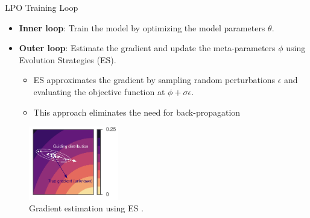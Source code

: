 \documentclass[9pt]{beamer}
\begin{document}
\begin{frame}{LPO Training Loop}

  \begin{itemize}
    \item \textbf{Inner loop}:
      Train the model by optimizing the model parameters \( \theta \).

    \vspace{1em}  %
    \item \textbf{Outer loop}:
      Estimate the gradient and update the meta-parameters \( \phi \) using Evolution Strategies (ES).
      \begin{itemize}
    \vspace{1em}  %
        \item ES approximates the gradient by sampling random perturbations \( \epsilon \) and evaluating the objective function at \( \phi + \sigma \epsilon \).
    \vspace{1em}  %
        \item This approach eliminates the need for back-propagation
      \end{itemize}
  \end{itemize}
  \begin{figure}
    \centering
    \includegraphics[width=0.35\textwidth]{figures/es.png}
    \caption{Gradient estimation using ES \cite{maheswaranathan2019guided}.}
    \label{fig:trl4}
  \end{figure}
\end{frame}
\end{document}
